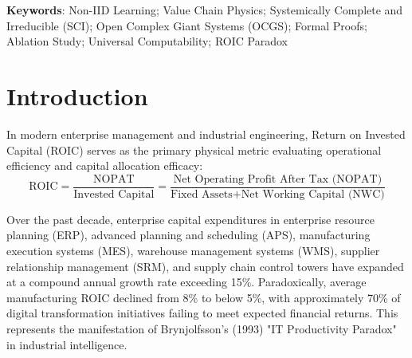 \documentclass[11pt,a4paper]{article}
\begin{document}
\begin{abstract}
Finally, under explicit mathematical conditions ($\mathbf{\Pi}$ partitioning, $\mathbf{\Pi}_\bot$ constraints, spectral radius $\rho(\mathbf{A}) < 1$, and human second-order meta-introspection $\mathbf{\Phi}$), we provide \textbf{formal mathematical proofs for the necessary and sufficient conditions of Qian Xuesen's three core OCGS principles} (Overall Design Department, Hall of Workshop for Decision Support, and Human-Machine Integration with Human-in-the-Lead). Empirical verification across a 10-year longitudinal field deployment (2015--2024) across Lenovo's global manufacturing network (including the WEF Lighthouse Factory in Hefei) and third-party audited financial metrics confirms that closed-loop autonomous decision-making ("human-out-of-the-loop" execution) dramatically reduces stoppage frequencies, releases RMB 3.5+ billion in NWC, and drives sustained ROIC elevation.
\end{abstract}

\textbf{Keywords}: Non-IID Learning; Value Chain Physics; Systemically Complete and Irreducible (SCI); Open Complex Giant Systems (OCGS); Formal Proofs; Ablation Study; Universal Computability; ROIC Paradox

\section{Introduction}
In modern enterprise management and industrial engineering, Return on Invested Capital (ROIC) serves as the primary physical metric evaluating operational efficiency and capital allocation efficacy:
\begin{equation}
\text{ROIC} = \frac{\text{NOPAT}}{\text{Invested Capital}} = \frac{\text{Net Operating Profit After Tax (NOPAT)}}{\text{Fixed Assets} + \text{Net Working Capital (NWC)}}
\end{equation}

Over the past decade, enterprise capital expenditures in enterprise resource planning (ERP), advanced planning and scheduling (APS), manufacturing execution systems (MES), warehouse management systems (WMS), supplier relationship management (SRM), and supply chain control towers have expanded at a compound annual growth rate exceeding 15\%. Paradoxically, average manufacturing ROIC declined from 8\% to below 5\%, with approximately 70\% of digital transformation initiatives failing to meet expected financial returns. This represents the manifestation of Brynjolfsson's (1993) "IT Productivity Paradox" in industrial intelligence.
\end{document}
